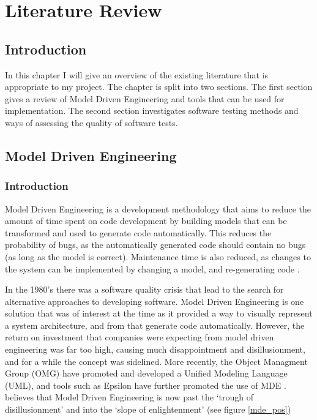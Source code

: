 \chapter{Literature Review}

\section{Introduction}
In this chapter I will give an overview of the existing literature that is appropriate to my project. The chapter is split into two sections. The first section gives a review of Model Driven Engineering and tools that can be used for implementation. The second section investigates software testing methods and ways of assessing the quality of software tests.

\section{Model Driven Engineering}

\subsection{Introduction}
Model Driven Engineering is a development methodology that aims to reduce the amount of time spent on code development by building models that can be transformed and used to generate code automatically. This reduces the probability of bugs, as the automatically generated code should contain no bugs (as long as the model is correct). Maintenance time is also reduced, as changes to the system can be implemented by changing a model, and re-generating code \citep{mdseLano}.

In the 1980's there was a software quality crisis that lead to the search for alternative approaches to developing software. Model Driven Engineering is one solution that was of interest at the time as it provided a way to visually represent a system architecture, and from that generate code automatically. However, the return on investment that companies were expecting from model driven engineering was far too high, causing much disappointment and disillusionment, and for a while the concept was sidelined. More recently, the Object Managment Group (OMG) have promoted and developed a Unified Modeling Language (UML), and tools such as Epsilon have further promoted the use of MDE \citep{mdeHistory}.  \citet{brambillaBook} believes that Model Driven Engineering is now past the `trough of disillusionment' and into the `slope of enlightenment' (see figure \ref{mde_pos}) \\

